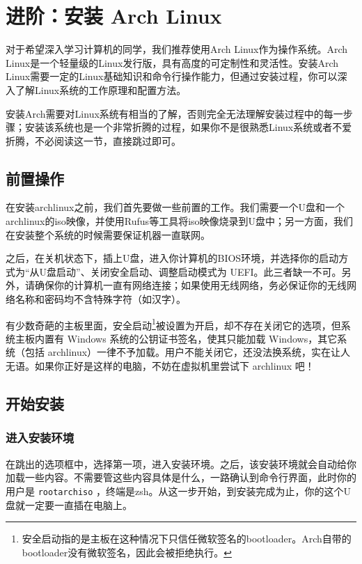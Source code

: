 \section{进阶：安装 Arch Linux}

对于希望深入学习计算机的同学，我们推荐使用Arch Linux作为操作系统。Arch Linux是一个轻量级的Linux发行版，具有高度的可定制性和灵活性。安装Arch Linux需要一定的Linux基础知识和命令行操作能力，但通过安装过程，你可以深入了解Linux系统的工作原理和配置方法。

安装Arch需要对Linux系统有相当的了解，否则完全无法理解安装过程中的每一步骤；安装该系统也是一个非常折腾的过程，如果你不是很熟悉Linux系统或者不爱折腾，不必阅读这一节，直接跳过即可。

\subsection{前置操作}

在安装archlinux之前，我们首先要做一些前置的工作。我们需要一个U盘和一个archlinux的iso映像，并使用Rufus等工具将iso映像烧录到U盘中；另一方面，我们在安装整个系统的时候需要保证机器一直联网。

之后，在关机状态下，插上U盘，进入你计算机的BIOS环境，并选择你的启动方式为“从U盘启动”、关闭安全启动、调整启动模式为 UEFI。此三者缺一不可。另外，请确保你的计算机一直有网络连接；如果使用无线网络，务必保证你的无线网络名称和密码均不含特殊字符（如汉字）。

\begin{note}
  有少数奇葩的主板里面，安全启动\footnote{安全启动指的是主板在这种情况下只信任微软签名的bootloader。Arch自带的bootloader没有微软签名，因此会被拒绝执行。}被设置为开启，却不存在关闭它的选项，但系统主板内置有 Windows 系统的公钥证书签名，使其只能加载 Windows，其它系统（包括 archlinux）一律不予加载。用户不能关闭它，还没法换系统，实在让人无语。如果你正好是这样的电脑，不妨在虚拟机里尝试下 archlinux 吧！
\end{note}

\subsection{开始安装}

\subsubsection{进入安装环境}

在跳出的选项框中，选择第一项，进入安装环境。之后，该安装环境就会自动给你加载一些内容。不需要管这些内容具体是什么，一路确认到命令行界面，此时你的用户是 \texttt{root\@ archiso} ，终端是zsh。从这一步开始，到安装完成为止，你的这个U盘就一定要一直插在电脑上。

